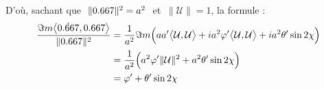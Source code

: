 \skipl

D'où, sachant que $\ \|\x\|^2=a^2\ $ et $\ \|\mathcal{U}\|=1$, la formule :
\begin{align*}
	\frac{\Im m\big\langle \dot{\x}, \x\big\rangle}{\|\x\|^2} &= \frac{1}{a^2}\Im m\Big(aa' \big\langle \mathcal{U}, \mathcal{U}\big\rangle  + ia^2\varphi' \big\langle \mathcal{U}, \mathcal{U}\big\rangle + ia^2\theta' \sin2\chi \Big) \\
	&= \frac{1}{a^2} \Big( a^2\varphi' \|\mathcal{U}\|^2 + a^2\theta' \sin2\chi \Big) \\
	&= \varphi' + \theta' \sin2\chi
\end{align*}